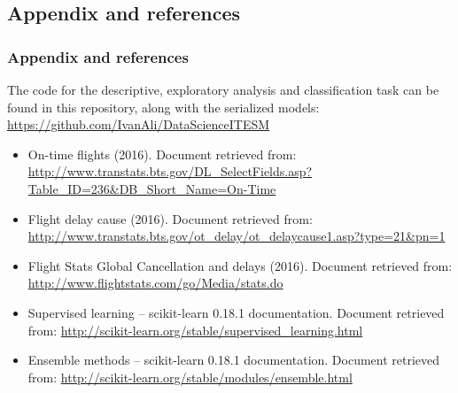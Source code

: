 \documentclass{beamer}
\begin{document}
	\begin{frame}[shrink=30]
		\section[Section]{Appendix and references}
		\frametitle{Appendix and references}
		The code for the descriptive, exploratory analysis and classification task can be found in this repository, along with the serialized models: \url{https://github.com/IvanAli/DataScienceITESM}\newline
		\begin{itemize}
	    \item On-time flights (2016). Document retrieved from: \url{http://www.transtats.bts.gov/DL\_SelectFields.asp?Table\_ID=236\&DB\_Short\_Name=On-Time}\newline
	    \item Flight delay cause (2016). Document retrieved from: \url{http://www.transtats.bts.gov/ot\_delay/ot\_delaycause1.asp?type=21\&pn=1}\newline
	    \item Flight Stats Global Cancellation and delays (2016). Document retrieved from:
		\url{http://www.flightstats.com/go/Media/stats.do}\newline
		\item Supervised learning -- scikit-learn 0.18.1 documentation. Document retrieved from:
		\url{http://scikit-learn.org/stable/supervised_learning.html}\newline
		\item Ensemble methods -- scikit-learn 0.18.1 documentation. Document retrieved from:
		\url{http://scikit-learn.org/stable/modules/ensemble.html}
		\end{itemize}
	\end{frame}
\end{document}
